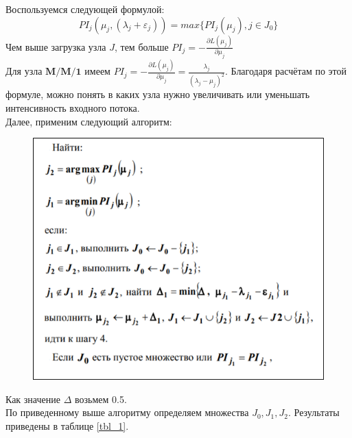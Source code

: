 Воспользуемся следующей формулой:
\begin{equation*}
PI_j(\mu_j,(\lambda_j+\varepsilon_j))=max\{PI_j(\mu_j), j\in J_0\}
\end{equation*}
Чем выше загрузка узла $J$, тем больше $PI_j=-\frac{\partial L(\mu_j)}{\partial\mu_j}$\\
Для узла $\textbf{M/M/1}$ имеем $PI_j=-\frac{\partial L(\mu_j)}{\partial\mu_j}=\frac{\lambda_j}{(\lambda_j-\mu_j)^2}$.
Благодаря расчётам по этой формуле, можно понять в каких узла нужно увеличивать или уменьшать интенсивность входного потока.\\
Далее, применим следующий алгоритм:
\begin{figure}[H]
  \centering
  \includegraphics[width=.8\textwidth]{img/alg}
\end{figure}
Как значение $\Delta$ возьмем 0.5.\\По приведенному выше алгоритму определяем множества $J_0, J_1, J_2$. Результаты приведены в таблице \ref{tbl_1}.


